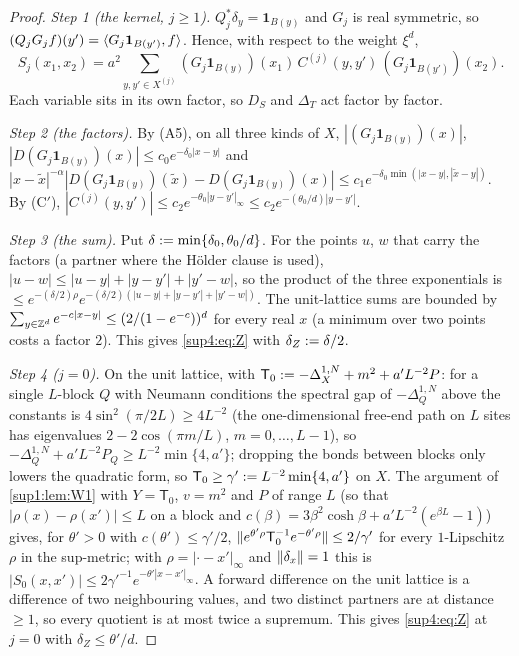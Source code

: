\begin{proof}
\emph{Step 1 (the kernel, $j\ge1$).} $Q_j^*\delta_y=\mathbf 1_{B(y)}$ and $G_j$ is real symmetric, so $(Q_jG_jf)(y')=\langle G_j\mathbf 1_{B(y')},f\rangle$. Hence, with respect to the weight $\xi^d$,
\[
S_j(x_1,x_2)=a^2\sum_{y,y'\in X^{(j)}}(G_j\mathbf 1_{B(y)})(x_1)\,C^{(j)}(y,y')\,(G_j\mathbf 1_{B(y')})(x_2).
\]
Each variable sits in its own factor, so $D_S$ and $\Delta_T$ act factor by factor.

\emph{Step 2 (the factors).} By (A5), on all three kinds of $X$, $|(G_j\mathbf 1_{B(y)})(x)|$, $|D(G_j\mathbf 1_{B(y)})(x)|\le c_0e^{-\delta_0|x-y|}$ and $|x-\tilde x|^{-\alpha}|D(G_j\mathbf 1_{B(y)})(\tilde x)-D(G_j\mathbf 1_{B(y)})(x)|\le c_1e^{-\delta_0\min(|x-y|,|\tilde x-y|)}$. By (C$'$), $|C^{(j)}(y,y')|\le c_2e^{-\theta_0|y-y'|_\infty}\le c_2e^{-(\theta_0/d)|y-y'|}$.

\emph{Step 3 (the sum).} Put $\delta:=\min\{\delta_0,\theta_0/d\}$. For the points $u$, $w$ that carry the factors (a partner where the H\"older clause is used), $|u-w|\le|u-y|+|y-y'|+|y'-w|$, so the product of the three exponentials is $\le e^{-(\delta/2)\rho}e^{-(\delta/2)(|u-y|+|y-y'|+|y'-w|)}$. The unit-lattice sums are bounded by $\sum_{y\in\mathbb Z^d}e^{-c|x-y|}\le(2/(1-e^{-c}))^d$ for every real $x$ (a minimum over two points costs a factor $2$). This gives \eqref{sup4:eq:Z} with $\delta_Z:=\delta/2$.

\emph{Step 4 ($j=0$).} On the unit lattice, with $\mathsf T_0:=-\Delta^{1,N}_X+m^2+a'L^{-2}P$: for a single $L$-block $Q$ with Neumann conditions the spectral gap of $-\Delta^{1,N}_Q$ above the constants is $4\sin^2(\pi/2L)\ge4L^{-2}$ (the one-dimensional free-end path on $L$ sites has eigenvalues $2-2\cos(\pi m/L)$, $m=0,\dots,L-1$), so $-\Delta^{1,N}_Q+a'L^{-2}P_Q\ge L^{-2}\min\{4,a'\}$; dropping the bonds between blocks only lowers the quadratic form, so $\mathsf T_0\ge\gamma':= L^{-2}\min\{4,a'\}$ on $X$. The argument of \cref{sup1:lem:W1} with $Y=\mathsf T_0$, $v=m^2$ and $P$ of range $L$ (so that $|\rho(x)-\rho(x')|\le L$ on a block and $c(\beta)=3\beta^2\cosh\beta+a'L^{-2}(e^{\beta L}-1)$) gives, for $\theta'>0$ with $c(\theta')\le\gamma'/2$, $\lVert e^{\theta'\rho}\mathsf T_0^{-1}e^{-\theta'\rho}\rVert\le2/\gamma'$ for every $1$-Lipschitz $\rho$ in the sup-metric; with $\rho=|\cdot-x'|_\infty$ and $\lVert \delta_x\rVert=1$ this is $|S_0(x,x')|\le2\gamma'^{-1}e^{-\theta'|x-x'|_\infty}$. A forward difference on the unit lattice is a difference of two neighbouring values, and two distinct partners are at distance $\ge1$, so every quotient is at most twice a supremum. This gives \eqref{sup4:eq:Z} at $j=0$ with $\delta_Z\le\theta'/d$.
\end{proof}

